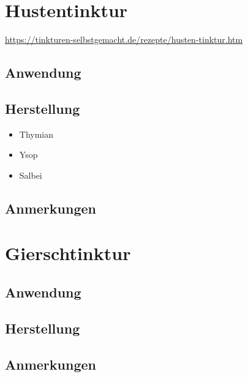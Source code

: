 \newpage



\section{Hustentinktur}


\cite{tinkturen}  

\url{https://tinkturen-selbstgemacht.de/rezepte/husten-tinktur.htm} 

 

\subsection{Anwendung}
\subsection{Herstellung}
\begin{itemize}
	\item Thymian
	\item Ysop
	\item Salbei
\end{itemize}

\subsection{Anmerkungen}



\newpage



\section{Gierschtinktur}


    

\subsection{Anwendung}
\subsection{Herstellung}
\subsection{Anmerkungen}



